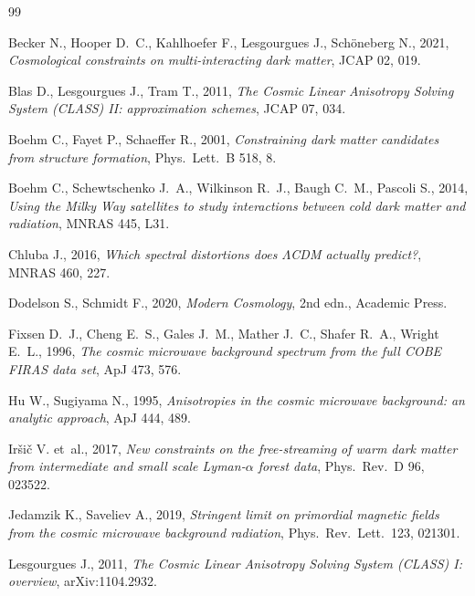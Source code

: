 \documentclass[11pt,a4paper]{article}
\begin{document}
\begin{thebibliography}{99}

Becker N., Hooper D.~C., Kahlhoefer F., Lesgourgues J., Sch\"oneberg N., 2021, \emph{Cosmological constraints on multi-interacting dark matter}, JCAP 02, 019.

Blas D., Lesgourgues J., Tram T., 2011, \emph{The Cosmic Linear Anisotropy Solving System (CLASS) II: approximation schemes}, JCAP 07, 034.

Boehm C., Fayet P., Schaeffer R., 2001, \emph{Constraining dark matter candidates from structure formation}, Phys.\ Lett.\ B 518, 8.

Boehm C., Schewtschenko J.~A., Wilkinson R.~J., Baugh C.~M., Pascoli S., 2014, \emph{Using the Milky Way satellites to study interactions between cold dark matter and radiation}, MNRAS 445, L31.

Chluba J., 2016, \emph{Which spectral distortions does $\Lambda$CDM actually predict?}, MNRAS 460, 227.

Dodelson S., Schmidt F., 2020, \emph{Modern Cosmology}, 2nd edn., Academic Press.

Fixsen D.~J., Cheng E.~S., Gales J.~M., Mather J.~C., Shafer R.~A., Wright E.~L., 1996, \emph{The cosmic microwave background spectrum from the full COBE FIRAS data set}, ApJ 473, 576.

Hu W., Sugiyama N., 1995, \emph{Anisotropies in the cosmic microwave background: an analytic approach}, ApJ 444, 489.

Ir\v{s}i\v{c} V. et~al., 2017, \emph{New constraints on the free-streaming of warm dark matter from intermediate and small scale Lyman-$\alpha$ forest data}, Phys.\ Rev.\ D 96, 023522.

Jedamzik K., Saveliev A., 2019, \emph{Stringent limit on primordial magnetic fields from the cosmic microwave background radiation}, Phys.\ Rev.\ Lett.\ 123, 021301.

Lesgourgues J., 2011, \emph{The Cosmic Linear Anisotropy Solving System (CLASS) I: overview}, arXiv:1104.2932.


\end{thebibliography}
\end{document}
